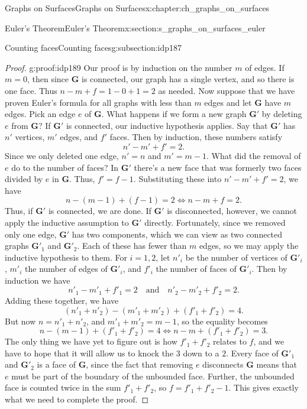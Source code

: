 \documentclass[oneside,10pt,]{book}
\numberwithin{equation}{section}
\newcommand{\bfG}{\mathbf{G}}
\begin{document}
\begin{chapterptx}{Graphs on Surfaces}{}{Graphs on Surfaces}{}{}{x:chapter:ch_graphs_on_surfaces}
\begin{sectionptx}{Euler's Theorem}{}{Euler's Theorem}{}{}{x:section:s_graphs_on_surfaces_euler}
\begin{subsectionptx}{Counting faces}{}{Counting faces}{}{}{g:subsection:idp187}
\begin{proof}{}{g:proof:idp189}
Our proof is by induction on the number \(m\) of edges. If \(m=0\), then since \(\bfG\) is connected, our graph has a single vertex, and so there is one face. Thus \(n-m+f = 1-0+1=2\) as needed. Now suppose that we have proven Euler's formula for all graphs with less than \(m\) edges and let \(\bfG\) have \(m\) edges. Pick an edge \(e\) of \(\bfG\). What happens if we form a new graph \(\bfG'\) by deleting \(e\) from \(\bfG\)? If \(\bfG'\) is connected, our inductive hypothesis applies. Say that \(\bfG'\) has \(n'\) vertices, \(m'\) edges, and \(f'\) faces. Then by induction, these numbers satisfy%
\begin{equation*}
n'-m'+f'=2.
\end{equation*}
Since we only deleted one edge, \(n'=n\) and \(m'=m-1\). What did the removal of \(e\) do to the number of faces? In \(\bfG'\) there's a new face that was formerly two faces divided by \(e\) in \(\bfG\). Thus, \(f'=f-1\). Substituting these into \(n'-m'+f'=2\), we have%
\begin{equation*}
n-(m-1)+(f-1)=2 \iff n-m+f=2.
\end{equation*}
Thus, if \(\bfG'\) is connected, we are done. If \(\bfG'\) is disconnected, however, we cannot apply the inductive assumption to \(\bfG'\) directly. Fortunately, since we removed only one edge, \(\bfG'\) has two components, which we can view as two connected graphs \(\bfG'_1\) and \(\bfG'_2\). Each of these has fewer than \(m\) edges, so we may apply the inductive hypothesis to them. For \(i=1,2\), let \(n'_i\) be the number of vertices of \(\bfG'_i\), \(m'_i\) the number of edges of \(\bfG'_i\), and \(f'_i\) the number of faces of \(\bfG'_i\). Then by induction we have%
\begin{equation*}
n'_1 - m'_1 + f'_1 = 2 \quad \text{and} \quad n'_2-m'_2+f'_2 =2.
\end{equation*}
Adding these together, we have%
\begin{equation*}
(n'_1 + n'_2) - (m'_1 + m'_2) + (f'_1 + f'_2) = 4.
\end{equation*}
But now \(n=n'_1 + n'_2\), and \(m'_1 + m'_2 = m-1\), so the equality becomes%
\begin{equation*}
n - (m-1) + (f'_1+f'_2) = 4 \iff n-m + (f'_1 + f'_2) = 3.
\end{equation*}
The only thing we have yet to figure out is how \(f'_1+f'_2\) relates to \(f\), and we have to hope that it will allow us to knock the \(3\) down to a \(2\). Every face of \(\bfG'_1\) and \(\bfG'_2\) is a face of \(\bfG\), since the fact that removing \(e\) disconnects \(\bfG\) means that \(e\) must be part of the boundary of the unbounded face. Further, the unbounded face is counted twice in the sum \(f'_1 + f'_2\), so \(f=f'_1 + f'_2 -1\). This gives exactly what we need to complete the proof.%

\end{proof}
\end{subsectionptx}
\end{sectionptx}
\end{chapterptx}
\end{document}
